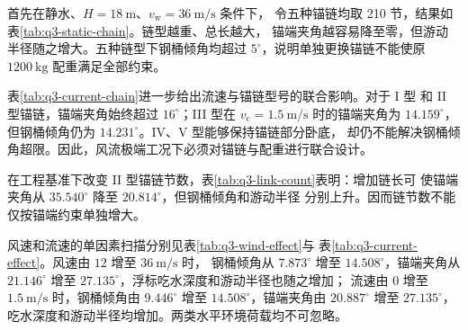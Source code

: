 首先在静水、\(H=18~\mathrm m\)、\(v_{\mathrm w}=36~\mathrm{m/s}\) 条件下，
令五种锚链均取 210 节，结果如表\ref{tab:q3-static-chain}。链型越重、总长越大，
锚端夹角越容易降至零，但游动半径随之增大。五种链型下钢桶倾角均超过
\(5^\circ\)，说明单独更换锚链不能使原 \(1200~\mathrm{kg}\) 配重满足全部约束。

\begin{table}[H]
  \centering
  \caption{静水条件下锚链型号与系统参数的关系（\(H=18~\mathrm m\)，\(v_{\mathrm w}=36~\mathrm{m/s}\)，\(N=210\)，\(m_{\mathrm s}=1200~\mathrm{kg}\)）}
  \label{tab:q3-static-chain}
  \scriptsize
  
\end{table}

表\ref{tab:q3-current-chain}进一步给出流速与锚链型号的联合影响。对于 I 型
和 II 型锚链，锚端夹角始终超过 \(16^\circ\)；III 型在
\(v_{\mathrm c}=1.5~\mathrm{m/s}\) 时的锚端夹角为 \(14.159^\circ\)，
但钢桶倾角仍为 \(14.231^\circ\)。IV、V 型能够保持锚链部分卧底，
却仍不能解决钢桶倾角超限。因此，风流极端工况下必须对锚链与配重进行联合设计。

\begin{table}[H]
  \centering
  \caption{水流速度与锚链型号对系统参数的联合影响（\(H=18~\mathrm m\)，\(v_{\mathrm w}=36~\mathrm{m/s}\)，\(N=210\)，\(m_{\mathrm s}=1200~\mathrm{kg}\)）}
  \label{tab:q3-current-chain}
  \scriptsize
  
\end{table}

在工程基准下改变 II 型锚链节数，表\ref{tab:q3-link-count}表明：增加链长可
使锚端夹角从 \(35.540^\circ\) 降至 \(20.814^\circ\)，但钢桶倾角和游动半径
分别上升。因而链节数不能仅按锚端约束单独增大。

\begin{table}[H]
  \centering
  \caption{不同链节数对系统参数的影响（II 型锚链，工程基准）}
  \label{tab:q3-link-count}
  \small
  
\end{table}

风速和流速的单因素扫描分别见表\ref{tab:q3-wind-effect}与
表\ref{tab:q3-current-effect}。风速由 \(12\) 增至 \(36~\mathrm{m/s}\) 时，
钢桶倾角从 \(7.873^\circ\) 增至 \(14.508^\circ\)，锚端夹角从
\(21.146^\circ\) 增至 \(27.135^\circ\)，浮标吃水深度和游动半径也随之增加；
流速由 \(0\) 增至 \(1.5~\mathrm{m/s}\) 时，钢桶倾角由 \(9.446^\circ\) 增至
\(14.508^\circ\)，锚端夹角由 \(20.887^\circ\) 增至 \(27.135^\circ\)，
吃水深度和游动半径均增加。两类水平环境荷载均不可忽略。

